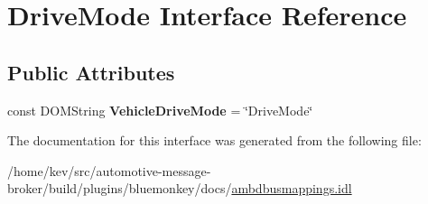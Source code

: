\hypertarget{interfaceDriveMode}{\section{Drive\+Mode Interface Reference}
\label{interfaceDriveMode}
}
\subsection*{Public Attributes}
\begin{DoxyCompactItemize}
\item 
\hypertarget{interfaceDriveMode_ae9c83f119100359aefcd52251b2d827e}{const D\+O\+M\+String {\bfseries Vehicle\+Drive\+Mode} = \char`\"{}Drive\+Mode\char`\"{}}\label{interfaceDriveMode_ae9c83f119100359aefcd52251b2d827e}

\end{DoxyCompactItemize}


The documentation for this interface was generated from the following file\+:\begin{DoxyCompactItemize}
\item 
/home/kev/src/automotive-\/message-\/broker/build/plugins/bluemonkey/docs/\hyperlink{ambdbusmappings_8idl}{ambdbusmappings.\+idl}\end{DoxyCompactItemize}
